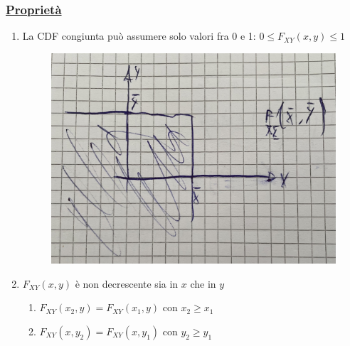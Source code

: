 \documentclass{article}
\begin{document}
\subsubsection{\underline{Proprietà}}
\begin{enumerate}
    \item La CDF congiunta può assumere solo valori fra 0 e 1: $0 \leq F_{XY}(x,y) \leq 1$
    \begin{figure}[H]
    \centering
    \includegraphics[scale=0.16]{images/70.Prop1CDFVettA.jpeg}
    \end{figure}
    \item $F_{XY}(x,y)$ è non decrescente sia in $x$ che in $y$
    \begin{enumerate}[label=\alph*]
        \item $F_{XY}(x_2,y) = F_{XY}(x_1,y)$ con $x_2 \geq x_1$
        \item $F_{XY}(x,y_2) = F_{XY}(x,y_1)$ con $y_2 \geq y_1$
    \end{enumerate}

\end{enumerate}
\end{document}
